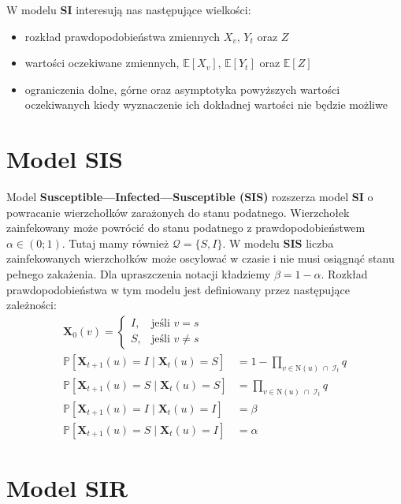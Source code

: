 W modelu \textbf{SI} interesują nas następujące wielkości:
\begin{itemize}
    \item rozkład prawdopodobieństwa zmiennych $X_v$, $Y_t$ oraz $Z$
    \item wartości oczekiwane zmiennych, $\mathbb{E}[X_v]$, $\mathbb{E}[Y_t]$ oraz $\mathbb{E}[Z]$
    \item ograniczenia dolne, górne oraz asymptotyka powyższych wartości oczekiwanych kiedy wyznaczenie ich dokładnej wartości nie będzie możliwe
\end{itemize}



\section{Model SIS}

Model \textbf{Susceptible—Infected—Susceptible (SIS)} rozszerza model \textbf{SI} o powracanie wierzchołków zarażonych do stanu podatnego. Wierzchołek zainfekowany może powrócić do stanu podatnego z prawdopodobieństwem $\alpha \in (0;1)$. Tutaj mamy również $\mathcal{Q} = \{S, I\}$.
W modelu \textbf{SIS} liczba zainfekowanych wierzchołków może oscylować w czasie i nie musi osiągnąć stanu pełnego zakażenia. Dla upraszczenia notacji kładziemy $\beta=1-\alpha $.
Rozkład prawdopodobieństwa w tym modelu jest definiowany przez następujące zależności:
\[
\begin{aligned}
\mathbf{X}_0(v) =
\begin{cases}
I, & \text{jeśli } v = s \\[4pt]
S, & \text{jeśli } v \neq s
\end{cases} \\
\mathbb{P}[\mathbf{X}_{t+1}(u) = I \mid \mathbf{X}_t(u) = S]
 &= 1 - \prod_{v \in \mathrm{N}(u) \;\cap\; \mathcal{I}_t} q \\[6pt]
\mathbb{P}[\mathbf{X}_{t+1}(u) = S \mid \mathbf{X}_t(u) = S]
 &= \prod_{v \in \mathrm{N}(u) \;\cap\; \mathcal{I}_t} q \\[6pt]
\mathbb{P}[\mathbf{X}_{t+1}(u) = I \mid \mathbf{X}_t(u) = I]
 &= \beta \\[6pt]
\mathbb{P}[\mathbf{X}_{t+1}(u) = S \mid \mathbf{X}_t(u) = I]
 &= \alpha
\end{aligned}
\]


\section{Model SIR}

